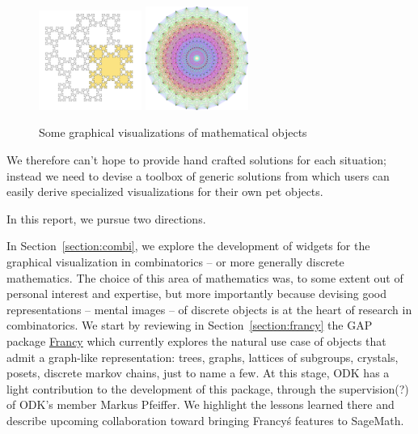 \documentclass{deliverablereport}
\begin{document}
\begin{figure}
\begin{center}
    \includegraphics[width=0.3\textwidth]{images/619px-Tiling_Fibonacci_word_fractal}
    \hfil
    \includegraphics[width=0.3\textwidth]{images/597px-E8Petrie}
  \end{center}
  \caption{Some graphical visualizations of mathematical objects}
  \label{fig:math_viz}
\end{figure}

We therefore can't hope to provide hand crafted solutions for each
situation; instead we need to devise a toolbox of generic solutions
from which users can easily derive specialized visualizations for
their own pet objects.

In this report, we pursue two directions.

In Section~\ref{section:combi}, we explore the development of widgets
for the graphical visualization in combinatorics -- or more generally
discrete mathematics. The choice of this area of mathematics was, to
some extent out of personal interest and expertise, but more
importantly because devising good representations -- mental images --
of discrete objects is at the heart of research in combinatorics. We
start by reviewing in Section~\ref{section:francy} the GAP package
\href{https://github.com/mcmartins/francy}{Francy} which currently
explores the natural use case of objects that admit a graph-like
representation: trees, graphs, lattices of subgroups, crystals,
posets, discrete markov chains, just to name a few. At this stage, ODK
has a light contribution to the development of this package, through
the supervision(?) of ODK's member Markus Pfeiffer. We highlight the
lessons learned there and describe upcoming collaboration toward
bringing Francy\'s features to SageMath.
\end{document}
